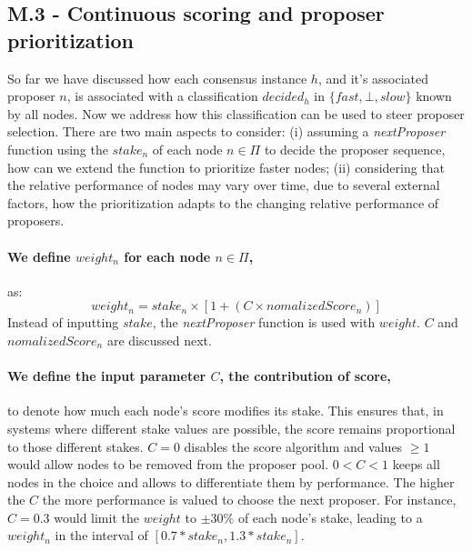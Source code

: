 \subsection{M.3 - Continuous scoring and proposer prioritization}
\label{subsec:scores}

So far we have discussed how each consensus instance $h$, and it's associated proposer $n$, is associated with a classification $decided_h$ in $\{fast, \bot, slow \}$ known by all nodes.
%
Now we address how this classification can be used to steer proposer selection.   There are two main aspects to consider: 
(i) assuming a \textit{nextProposer} function using the $stake_n$ of each node $n \in \Pi$ to decide the proposer sequence, how can we extend the function to prioritize faster nodes;
(ii) considering that the relative performance of nodes may vary over time, due to several external factors, how the prioritization adapts to the changing relative performance of proposers.

\paragraph{We define $weight_n$ for each node $n \in \Pi$,} as: 
\begin{equation} 
\label{eq.weight}
weight_n = stake_n \times [1 + ( C \times nomalizedScore_n) ]
\end{equation}
Instead of inputting $stake$, the \textit{nextProposer} function is used with $weight$.   $C$ and $nomalizedScore_n$ are discussed next.

\paragraph{We define the input parameter $C$, the contribution of score,} to denote how much each node's score modifies its stake. This ensures that, in systems where different stake values are possible, the score remains proportional to those different stakes. 
$C=0$ disables the score algorithm and values $\geq1$ would allow nodes to be removed from the proposer pool. $0 < C < 1$ keeps all nodes in the choice and allows to differentiate them by performance.  The higher the $C$ the more performance is valued to choose the next proposer.  
%
For instance, $C=0.3$ would limit the $weight$ to $\pm30\%$  of each node's stake, leading to a $weight_n$ in the interval of $[0.7*stake_n, 1.3*stake_n]$. 

